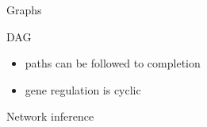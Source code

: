 \begin{frame}{Graphs}
\begin{itemize}
\end{itemize}
DAG
\begin{itemize}
    \item paths can be followed to completion
    \item gene regulation is cyclic
\end{itemize}
Network inference

\end{frame}
